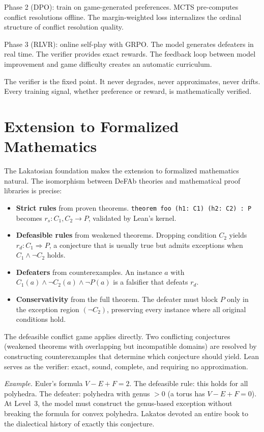 \documentclass[11pt]{article}
\newcommand{\defto}{\Rightarrow}
\newcommand{\strictto}{\rightarrow}
\begin{document}
Phase 2 (DPO): train on game-generated preferences. MCTS pre-computes conflict resolutions offline. The margin-weighted loss internalizes the ordinal structure of conflict resolution quality.

Phase 3 (RLVR): online self-play with GRPO. The model generates defeaters in real time. The verifier provides exact rewards. The feedback loop between model improvement and game difficulty creates an automatic curriculum.

The verifier is the fixed point. It never degrades, never approximates, never drifts. Every training signal, whether preference or reward, is mathematically verified.

\section{Extension to Formalized Mathematics}

The Lakatosian foundation makes the extension to formalized mathematics natural. The isomorphism between DeFAb theories and mathematical proof libraries is precise:

\begin{itemize}[nosep]
    \item \textbf{Strict rules} from proven theorems. \texttt{theorem foo (h1: C1) (h2: C2) : P} becomes $r_s\colon C_1, C_2 \strictto P$, validated by Lean's kernel.
    \item \textbf{Defeasible rules} from weakened theorems. Dropping condition $C_2$ yields $r_d\colon C_1 \defto P$, a conjecture that is usually true but admits exceptions when $C_1 \wedge \neg C_2$ holds.
    \item \textbf{Defeaters} from counterexamples. An instance $a$ with $C_1(a) \wedge \neg C_2(a) \wedge \neg P(a)$ is a falsifier that defeats $r_d$.
    \item \textbf{Conservativity} from the full theorem. The defeater must block $P$ only in the exception region $(\neg C_2)$, preserving every instance where all original conditions hold.
\end{itemize}

The defeasible conflict game applies directly. Two conflicting conjectures (weakened theorems with overlapping but incompatible domains) are resolved by constructing counterexamples that determine which conjecture should yield. Lean serves as the verifier: exact, sound, complete, and requiring no approximation.

\textit{Example.} Euler's formula $V - E + F = 2$. The defeasible rule: this holds for all polyhedra. The defeater: polyhedra with genus $> 0$ (a torus has $V - E + F = 0$). At Level~3, the model must construct the genus-based exception without breaking the formula for convex polyhedra. Lakatos devoted an entire book to the dialectical history of exactly this conjecture.
\end{document}
